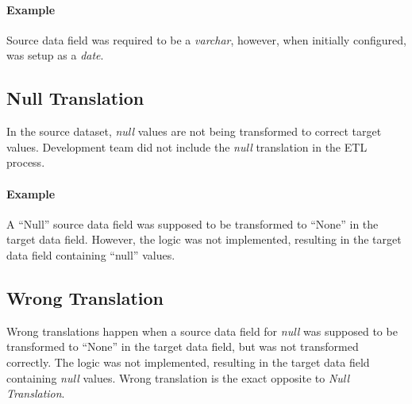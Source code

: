 \paragraph*{Example} Source data field was required to be a \textit{varchar}, however, when initially configured, was setup as a \textit{date}.


\subsection*{Null Translation}

In the source dataset, \textit{null} values are not being transformed to correct target values.
Development team did not include the \textit{null} translation in the ETL process.

\paragraph*{Example} A \enquote{Null} source data field was supposed to be transformed to \enquote{None} in the target data field.
However, the logic was not implemented, resulting in the target data field containing \enquote{null} values\footnotemark.



\subsection*{Wrong Translation}

Wrong translations happen when a source data field for \textit{null} was supposed to be transformed to \enquote{None} in the target data field, but was not transformed correctly.
The logic was not implemented, resulting in the target data field containing \textit{null} values.
Wrong translation is the exact opposite to \textit{Null Translation}.

